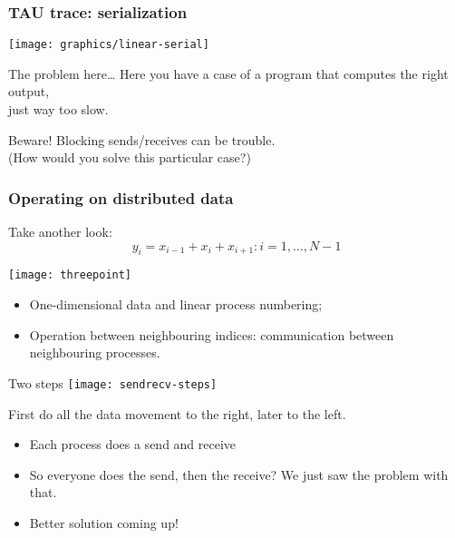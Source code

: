 \begin{exerciseframe}[serialsend]
  
\end{exerciseframe}

\begin{frame}[containsverbatim]\frametitle{TAU trace: serialization}
  \texttt{[image: graphics/linear-serial]}
  \label{fig:serialization}
\end{frame}

\begin{frame}{The problem here\ldots}
  Here you have a case of a program that computes the right output,\\
  just way too slow.

  Beware! Blocking sends/receives can be trouble. \\
  (How would you solve this particular case?)
\end{frame}

\begin{optexerciseframe}
  
\end{optexerciseframe}


\begin{frame}[containsverbatim]\frametitle{Operating on distributed data}
Take another look: \[ y_i=x_{i-1}+x_i+x_{i+1}\colon i=1,\ldots,N-1 \]

\texttt{[image: threepoint]}

\begin{itemize}
\item One-dimensional data and linear process numbering;
\item Operation between neighbouring indices: communication between
  neighbouring processes.
\end{itemize}
\end{frame}

\begin{frame}{Two steps}
  \texttt{[image: sendrecv-steps]}

  First do all the data movement to the right, later to the left.
  \begin{itemize}
  \item Each process does a send and receive
  \item So everyone does the send, then the receive? We just saw the
    problem with that.
  \item Better solution coming up!
  \end{itemize}
\end{frame}

